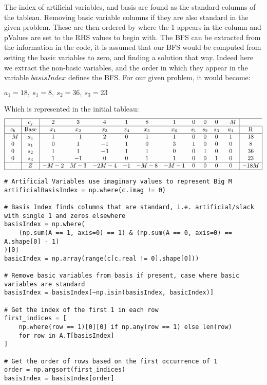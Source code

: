 \documentclass[letterpaper, a4paper]{article}
\begin{document}
The index of artificial variables, and basis are found as the standard columns of the tableau. Removing basic variable columns if they are also standard in the given problem. These are then ordered by where the 1 appears in the column and pValues are set to the RHS values to begin with. The BFS can be extracted from the information in the code, it is assumed that our BFS would be computed from setting the basic variables to zero, and finding a solution that way. Indeed here we extract the non-basic variables, and the order in which they appear in the variable $basisIndex$ defines the BFS. For our given problem, it would become:

\begin{center}
$a_1 = 18,\ s_1 = 8,\ s_2 = 36,\ s_3 = 23$
\end{center}
Which is represented in the initial tableau:
\[
\begin{array}{|c|c|cccccccccc|c|}
\hline
& c_j & 2 & 3 & 4 & 1 & 8 & 1 & 0 & 0 & 0 & -M \\
\hline
c_b & \text{Base} & x_1 & x_2 & x_3 & x_4 & x_5 & x_6 & s_1 & s_2 & s_3 & a_1 & \text{R} \\
\hline
-M & a_1 & 1 & -1 & 2 & 0 & 1 & 1 & 0 & 0 & 0 & 1 & 18 \\
0 &  s_1 & 0 & 1 & -1 & 1 & 0 & 3 & 1 & 0 & 0 & 0 & 8 \\
0 &  s_2 & 1 & 1 & -3 & 1 & 1 & 0 & 0 & 1 & 0 & 0 & 36 \\
0 &  s_3 & 1 & -1 & 0 & 0 & 1 & 1 & 0 & 0 & 1 & 0 & 23 \\
\hline
& Z & -M-2 & M-3 & -2M-4 & -1 & -M-8 & -M-1 & 0 & 0 & 0 & 0 & -18M \\
\hline
\end{array}
\]

\begingroup
\fontsize{8}{10}\selectfont
\begin{verbatim}
# Artificial Variables use imaginary values to represent Big M
artificialBasisIndex = np.where(c.imag != 0)

# Basis Index finds columns that are standard, i.e. artificial/slack with single 1 and zeros elsewhere
basisIndex = np.where(
    (np.sum(A == 1, axis=0) == 1) & (np.sum(A == 0, axis=0) == A.shape[0] - 1)
)[0]
basicIndex = np.array(range(c[c.real != 0].shape[0]))

# Remove basic variables from basis if present, case where basic variables are standard
basisIndex = basisIndex[~np.isin(basisIndex, basicIndex)]

# Get the index of the first 1 in each row
first_indices = [
    np.where(row == 1)[0][0] if np.any(row == 1) else len(row)
    for row in A.T[basisIndex]
]

# Get the order of rows based on the first occurrence of 1
order = np.argsort(first_indices)
basisIndex = basisIndex[order]
\end{verbatim}
\endgroup
\end{document}
